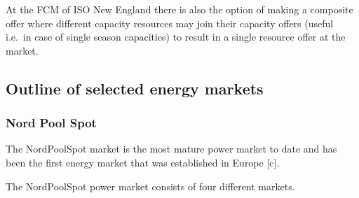 At the FCM of ISO New England there is also the option of making a composite offer where different capacity resources may join their capacity offers (useful i.e.~in case of single season capacities) to result in a single resource offer at the market. 



%
%





\subsection{Outline of selected energy markets}



\subsubsection{Nord Pool Spot}


The NordPoolSpot market is the most mature power market to date and has been the first energy market that was established in Europe [c]. 

The NordPoolSpot power market consists of four different markets. 


